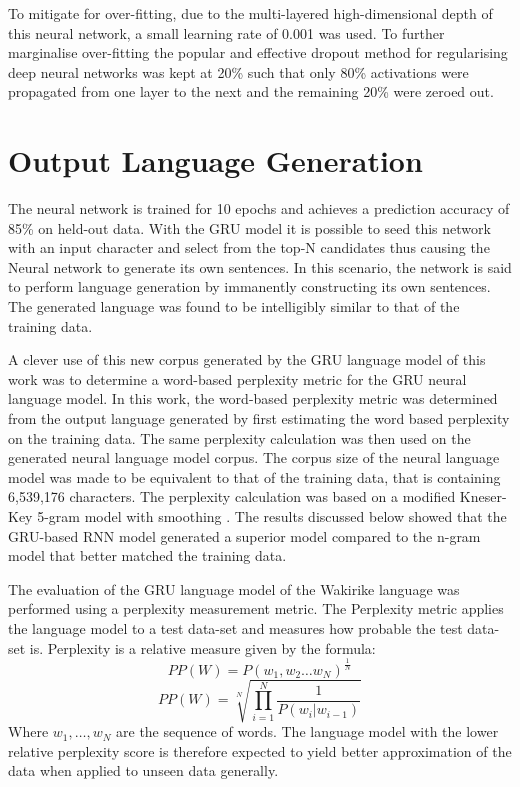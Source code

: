 To mitigate for over-fitting, due to the multi-layered high-dimensional depth of this neural network, a small learning rate of 0.001 was used. To further marginalise over-fitting the popular and effective dropout method \citep{srivastava2014dropout} for regularising deep neural networks was kept at 20\% such that only 80\% activations were propagated from one layer to the next and the remaining 20\% were zeroed out.

\section{Output Language Generation}
The neural network is trained for 10 epochs and achieves a prediction accuracy of 85\% on held-out data.  With the GRU model it is possible to seed this network with an input character and select from the top-N candidates thus causing the Neural network to generate its own sentences.  In this scenario, the network is said to perform language generation by immanently constructing its own sentences.  The generated language was found to be intelligibly similar to that of the training data. 

A clever use of this new corpus generated by the GRU language model of this work was to determine a word-based perplexity metric for the GRU neural language model. In this work, the word-based perplexity metric was determined from the output language generated by first estimating the word based perplexity on the training data.  The same perplexity calculation was then used on the generated neural language model corpus. The corpus size of the neural language model was made to be equivalent to that of the training data, that is containing 6,539,176 characters.  The perplexity calculation was based on a modified Kneser-Key 5-gram model with smoothing \citep{Heafield-estimate}.  The results discussed below showed that the GRU-based RNN model generated a superior model compared to the n-gram model that better matched the training data.

The evaluation of the GRU language model of the Wakirike language was performed using a perplexity measurement metric. The Perplexity metric applies the language model to a test data-set and measures how probable the test data-set is. Perplexity is a relative measure given by the formula:
%
\begin{equation}
PP(W)=P(w_1,w_2\dots w_N)^\frac{1}{N}
\label{ch5_eq1_ppx}
\end{equation}
%
%
\begin{equation}
PP(W)=\sqrt[N]{\prod_{i=1}^N\frac{1}{P(w_i|w_{i-1})}}
\label{ch5_eq2_ppx}
\end{equation}
%
Where $w_1,\dots,w_N$ are the sequence of words. The language model with the lower relative perplexity score is therefore expected to yield better approximation of the data when applied to unseen data generally.


